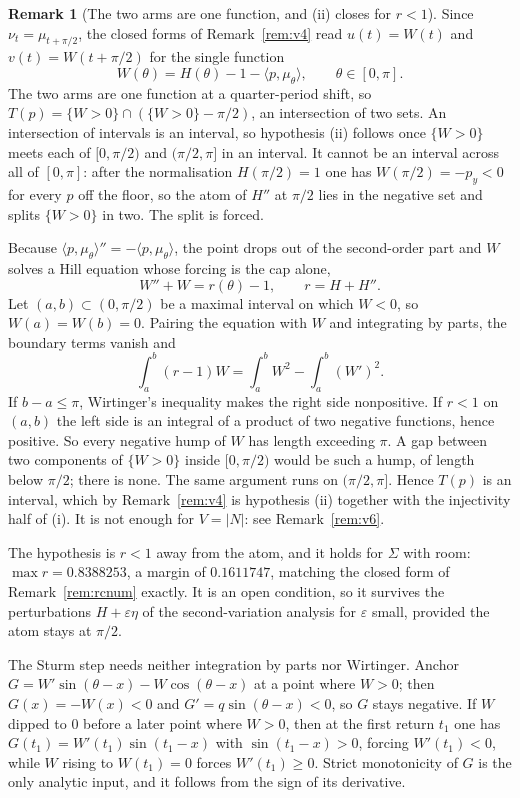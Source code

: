 \documentclass[11pt]{article}
\theoremstyle{definition}
\newtheorem{remark}[theorem]{Remark}
\newcommand{\Sig}{\Sigma}
\begin{document}
\begin{remark}[The two arms are one function, and (ii) closes for $r<1$]\label{rem:v5}
Since $\nu_t=\mu_{t+\pi/2}$, the closed forms of Remark~\ref{rem:v4} read
$u(t)=W(t)$ and $v(t)=W(t+\pi/2)$ for the single function
\[
  W(\theta)=H(\theta)-1-\langle p,\mu_\theta\rangle ,\qquad \theta\in[0,\pi].
\]
The two arms are one function at a quarter-period shift, so
$T(p)=\{W>0\}\cap(\{W>0\}-\pi/2)$, an intersection of two sets. An intersection of intervals
is an interval, so hypothesis (ii) follows once $\{W>0\}$ meets each of $[0,\pi/2)$ and
$(\pi/2,\pi]$ in an interval. It cannot be an interval across all of $[0,\pi]$: after the
normalisation $H(\pi/2)=1$ one has $W(\pi/2)=-p_y<0$ for every $p$ off the floor, so the
atom of $H''$ at $\pi/2$ lies in the negative set and splits $\{W>0\}$ in two. The split is
forced.

Because $\langle p,\mu_\theta\rangle''=-\langle p,\mu_\theta\rangle$, the point drops out of
the second-order part and $W$ solves a Hill equation whose forcing is the cap alone,
\[
  W''+W=r(\theta)-1,\qquad r=H+H'' .
\]
Let $(a,b)\subset(0,\pi/2)$ be a maximal interval on which $W<0$, so $W(a)=W(b)=0$. Pairing
the equation with $W$ and integrating by parts, the boundary terms vanish and
\[
  \int_a^b (r-1)W=\int_a^b W^2-\int_a^b (W')^2 .
\]
If $b-a\le\pi$, Wirtinger's inequality makes the right side nonpositive. If $r<1$ on $(a,b)$
the left side is an integral of a product of two negative functions, hence positive. So
every negative hump of $W$ has length exceeding $\pi$. A gap between two components of
$\{W>0\}$ inside $[0,\pi/2)$ would be such a hump, of length below $\pi/2$; there is none.
The same argument runs on $(\pi/2,\pi]$. Hence $T(p)$ is an interval, which by
Remark~\ref{rem:v4} is hypothesis (ii) together with the injectivity half of (i). It is not
enough for $V=|N|$: see Remark~\ref{rem:v6}.

The hypothesis is $r<1$ away from the atom, and it holds for $\Sig$ with room:
$\max r=0.8388253$, a margin of $0.1611747$, matching the closed form of
Remark~\ref{rem:rcnum} exactly. It is an open
condition, so it survives the perturbations $H+\varepsilon\eta$ of the second-variation
analysis for $\varepsilon$ small, provided the atom stays at $\pi/2$.

The Sturm step needs neither integration by parts nor Wirtinger. Anchor
$G=W'\sin(\theta-x)-W\cos(\theta-x)$ at a point where $W>0$; then $G(x)=-W(x)<0$ and
$G'=q\sin(\theta-x)<0$, so $G$ stays negative. If $W$ dipped to $0$ before a later point
where $W>0$, then at the first return $t_1$ one has $G(t_1)=W'(t_1)\sin(t_1-x)$ with
$\sin(t_1-x)>0$, forcing $W'(t_1)<0$, while $W$ rising to $W(t_1)=0$ forces
$W'(t_1)\ge0$. Strict monotonicity of $G$ is the only analytic input, and it follows from
the sign of its derivative.


\end{remark}
\end{document}
